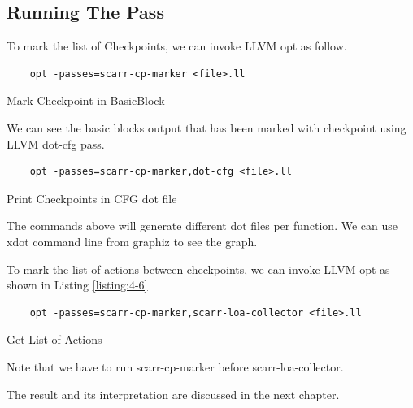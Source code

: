 \subsection{Running The Pass}

To mark the list of Checkpoints, we can invoke LLVM opt as follow.

\begin{listing}
\begin{verbatim}
    opt -passes=scarr-cp-marker <file>.ll
\end{verbatim}
\caption{Mark Checkpoint in BasicBlock}    
\label{listing:4-4}
\end{listing}

We can see the basic blocks output that has been marked with checkpoint using LLVM dot-cfg pass.

\begin{listing}
\begin{verbatim}
    opt -passes=scarr-cp-marker,dot-cfg <file>.ll
\end{verbatim}
\caption{Print Checkpoints in CFG dot file}    
\label{listing:4-5}
\end{listing}

The commands above will generate different dot files per function. We can use xdot command line from graphiz to see the graph. 

To mark the list of actions between checkpoints, we can invoke LLVM opt as shown in Listing \ref{listing:4-6}

\begin{listing}
\begin{verbatim}
    opt -passes=scarr-cp-marker,scarr-loa-collector <file>.ll
\end{verbatim}
\caption{Get List of Actions}    
\label{listing:4-6}
\end{listing}

Note that we have to run scarr-cp-marker before scarr-loa-collector.

The result and its interpretation are discussed in the next chapter.
